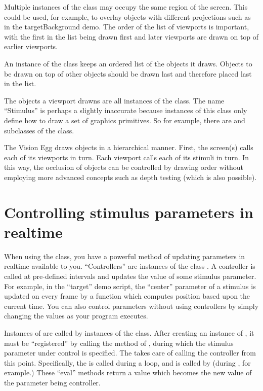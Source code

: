 \documentclass{manual}
\begin{document}
Multiple instances of the  class may occupy the same
region of the screen.  This could be used, for example, to overlay
objects with different projections such as in the targetBackground
demo.  The order of the list of viewports is important, with the first
in the list being drawn first and later viewports are drawn on top of
earlier viewports.

An instance of the  class keeps an ordered list of the
objects it draws.  Objects to be drawn on top of other objects should
be drawn last and therefore placed last in the list.

The objects a viewport drawns are all instances of the
 class. The name ``Stimulus'' is perhaps a slightly
inaccurate because instances of this class only define how to draw a
set of graphics primitives. So for example, there are
 and  subclasses of the
 class.

The Vision Egg draws objects in a hierarchical manner.  First, the
screen(s) calls each of its viewports in turn.  Each viewport calls
each of its stimuli in turn.  In this way, the occlusion of objects
can be controlled by drawing order without employing more advanced
concepts such as depth testing (which is also possible).

\chapter{Controlling stimulus parameters in realtime \label{controllers}}

When using the  class, you have a powerful method
of updating parameters in realtime available to you.  ``Controllers''
are instances of the class .  A controller is called
at pre-defined intervals and updates the value of some stimulus
parameter.  For example, in the ``target'' demo script, the ``center''
parameter of a  stimulus is updated on every frame by
a function which computes position based upon the current time.  You
can also control parameters without using controllers by simply
changing the values as your program executes.

Instances of  are called by instances of the
 class.  After creating an instance of
, it must be ``registered'' by calling the
 method of , during which
the stimulus parameter under control is specified.  The
 takes care of calling the controller from this
point. Specifically, the  is called during a
 loop, and  is called by
 (during , for
example.)  These ``eval'' methods return a value which becomes the
new value of the parameter being controller.
\end{document}
